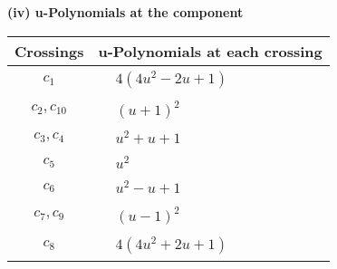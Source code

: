 \documentclass[1p]{elsarticle_modified}
\theoremstyle{definition}
\begin{document}
\newpage\renewcommand{\arraystretch}{1}
\flushleft \textbf{(iv) u-Polynomials at the component}\newline \\
\begin{tabular}{m{50pt}|m{274pt}}
Crossings & \hspace{64pt}u-Polynomials at each crossing \\
\hline $$\begin{aligned}c_{1}\end{aligned}$$&$\begin{aligned}
&4(4 u^2-2 u+1)
\end{aligned}$\\
\hline $$\begin{aligned}c_{2},c_{10}\end{aligned}$$&$\begin{aligned}
&(u+1)^2
\end{aligned}$\\
\hline $$\begin{aligned}c_{3},c_{4}\end{aligned}$$&$\begin{aligned}
&u^2+u+1
\end{aligned}$\\
\hline $$\begin{aligned}c_{5}\end{aligned}$$&$\begin{aligned}
&u^2
\end{aligned}$\\
\hline $$\begin{aligned}c_{6}\end{aligned}$$&$\begin{aligned}
&u^2- u+1
\end{aligned}$\\
\hline $$\begin{aligned}c_{7},c_{9}\end{aligned}$$&$\begin{aligned}
&(u-1)^2
\end{aligned}$\\
\hline $$\begin{aligned}c_{8}\end{aligned}$$&$\begin{aligned}
&4(4 u^2+2 u+1)
\end{aligned}$\\
\hline
\end{tabular}\\~\\
\newpage\renewcommand{\arraystretch}{1}
\end{document}
